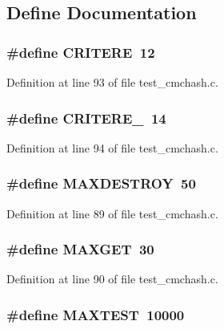 \subsection{Define Documentation}
\subsubsection[{CRITERE}]{\setlength{\rightskip}{0pt plus 5cm}\#define CRITERE~12}\label{test__cmchash_8c_ab2da1e226a5beeff3269ec19b1f2b0b9}


Definition at line 93 of file test\_\-cmchash.c.
\subsubsection[{CRITERE\_\-2}]{\setlength{\rightskip}{0pt plus 5cm}\#define CRITERE\_~14}\label{test__cmchash_8c_ad449333f1ec8fe49765893cc1980d94d}


Definition at line 94 of file test\_\-cmchash.c.
\subsubsection[{MAXDESTROY}]{\setlength{\rightskip}{0pt plus 5cm}\#define MAXDESTROY~50}\label{test__cmchash_8c_a428c97a2aa1643805f8b16275c702607}


Definition at line 89 of file test\_\-cmchash.c.
\subsubsection[{MAXGET}]{\setlength{\rightskip}{0pt plus 5cm}\#define MAXGET~30}\label{test__cmchash_8c_a7d82597c4bd22fe023995390a5a90f95}


Definition at line 90 of file test\_\-cmchash.c.
\subsubsection[{MAXTEST}]{\setlength{\rightskip}{0pt plus 5cm}\#define MAXTEST~10000}\label{test__cmchash_8c_a03d9dd35a7b43ebc597de16d46a0e845}


